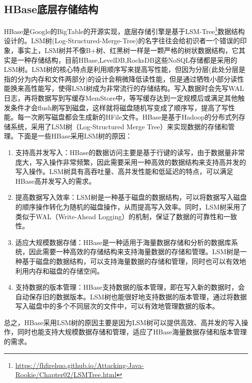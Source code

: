 \documentclass[../../../interview-questions.tex]{subfiles}
\begin{document}
\subsection{HBase底层存储结构}

HBase是Google的BigTable的开源实现，底层存储引擎是基于LSM-Tree\footnote{\url{https://fhfirehuo.github.io/Attacking-Java-Rookie/Chapter02/LSMTree.html}}数据结构设计的。LSM树(Log-Structured-Merge-Tree)的名字往往会给初识者一个错误的印象，事实上，LSM树并不像B+树、红黑树一样是一颗严格的树状数据结构，它其实是一种存储结构，目前HBase,LevelDB,RocksDB这些NoSQL存储都是采用的LSM树。LSM树的核心特点是利用顺序写来提高写性能，但因为分层(此处分层是指的分为内存和文件两部分)的设计会稍微降低读性能，但是通过牺牲小部分读性能换来高性能写，使得LSM树成为非常流行的存储结构。写入数据时会先写WAL日志，再将数据写到写缓存MemStore中，等写缓存达到一定规模后或满足其他触发条件才会flush刷写到磁盘，这样就将磁盘随机写变成了顺序写，提高了写性能。每一次刷写磁盘都会生成新的HFile文件。HBase是基于Hadoop的分布式列存储系统，采用了LSM树（Log-Structured Merge Tree）来实现数据的存储和管理。下面是一些HBase采用LSM树的原因：

\begin{enumerate}
    \item {支持高并发写入：HBase的数据访问主要是基于行键的读写，由于数据量非常庞大，写入操作非常频繁，因此需要采用一种高效的数据结构来支持高并发的写入操作。LSM树具有高吞吐量、高并发性能和低延迟的特点，可以满足HBase高并发写入的需求。}
    \item {提高数据写入效率：LSM树是一种基于磁盘的数据结构，可以将数据写入磁盘的顺序操作转化为随机的磁盘操作，从而提高写入效率。同时，LSM树采用了类似于WAL（Write-Ahead Logging）的机制，保证了数据的可靠性和一致性。}
    \item {适应大规模数据存储：HBase是一种适用于海量数据存储和分析的数据库系统，因此需要一种高效的存储结构来支持海量数据的存储和管理。LSM树是一种基于磁盘的数据结构，可以支持海量数据的存储和管理，同时也可以有效地利用内存和磁盘的存储空间。}
    \item {支持数据的版本管理：HBase支持数据的版本管理，即在写入新的数据时，会自动保存旧的数据版本。LSM树也能很好地支持数据的版本管理，通过将数据写入磁盘中的多个不同层次的文件中，可以有效地管理数据的版本。}
\end{enumerate}

总之，HBase采用LSM树的原因主要是因为LSM树可以提供高效、高并发的写入操作，同时也能支持大规模数据存储和管理，适应了HBase海量数据存储和版本管理的需求。
\end{document}
